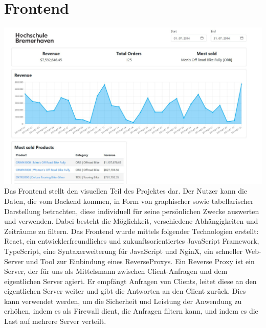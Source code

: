 \section*{Frontend}
\newline
\includegraphics[width=\linewidth]{src/abbildungen/Frontend.png}
\newline
\newline
\newline
Das Frontend stellt den visuellen Teil des Projektes dar. Der Nutzer kann die Daten, die vom Backend kommen, in Form von graphischer sowie tabellarischer Darstellung betrachten, diese individuell für seine persönlichen Zwecke auswerten und verwenden. Dabei besteht die Möglichkeit, verschiedene Abhängigkeiten und Zeiträume zu filtern.
\newline
\newline
Das Frontend wurde mittels folgender Technologien erstellt: React, ein entwicklerfreundliches und zukunftsorientiertes JavaScript Framework, TypeScript, eine Syntaxerweiterung für JavaScript und NginX, ein schneller Web-Server und Tool zur Einbindung eines ReverseProxys.
\newline
\newline
Ein Reverse Proxy ist ein Server, der für uns als Mittelsmann zwischen Client-Anfragen und dem eigentlichen Server agiert. Er empfängt Anfragen von Clients, leitet diese an den eigentlichen Server weiter und gibt die Antworten an den Client zurück. Dies kann verwendet werden, um die Sicherheit und Leistung der Anwendung zu erhöhen, indem es als Firewall dient, die Anfragen filtern kann, und indem es die Last auf mehrere Server verteilt.


